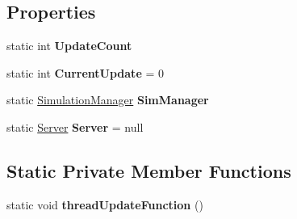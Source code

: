 \subsection*{Properties}
\begin{DoxyCompactItemize}
\item 
\mbox{\label{class_n_g_sim_1_1_update_manager_a5660573042def95989aaf15d13cd2916}} 
static int {\bfseries Update\+Count}
\item 
\mbox{\label{class_n_g_sim_1_1_update_manager_afcf4df35277ec7b38bb57da065d3041d}} 
static int {\bfseries Current\+Update} = 0
\item 
\mbox{\label{class_n_g_sim_1_1_update_manager_a7c175ddc2fe6ad55d8ecc5611a249463}} 
static \hyperlink{class_n_g_sim_1_1_simulation_manager}{Simulation\+Manager} {\bfseries Sim\+Manager}
\item 
\mbox{\label{class_n_g_sim_1_1_update_manager_ac607db2842aaaff16639cdb86a13b4ed}} 
static \hyperlink{class_n_g_sim_1_1_network_1_1_server}{Server} {\bfseries Server} = null
\end{DoxyCompactItemize}
\subsection*{Static Private Member Functions}
\begin{DoxyCompactItemize}
\item 
\mbox{\label{class_n_g_sim_1_1_update_manager_ac597795b241e09a073fc681b1fbe0388}} 
static void {\bfseries thread\+Update\+Function} ()
\end{DoxyCompactItemize}
